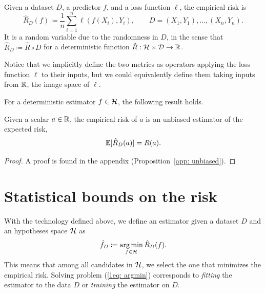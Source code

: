 \documentclass[reqno]{amsart}
\begin{document}
\begin{definition}
Given a dataset $D$, a predictor $f$, and a loss function $\ell$, the empirical risk is
    \begin{equation}
        \hat R_D(f) \coloneq \frac{1}{n}\sum_{i=1}^n \ell(f(X_i),Y_i), \qquad D = (X_1,Y_1),\ldots,(X_n,Y_n).
    \end{equation}
    It is a random variable due to the randomness in $D$, in the sense that $\hat R_D \coloneq \hat R \circ D$ for a deterministic function $\hat R:\mathcal{H} \times \mathcal{D}\to\mathbb{R}$.
\end{definition}

\begin{remark}
    Notice that we implicitly define the two metrics as operators applying the loss function $\ell$ to their inputs, but we could equivalently define them taking inputs from $\mathbb{R}$, the image space of $\ell$. 
\end{remark}
For a deterministic estimator $f\in\mathcal{H}$, the following result holds.

\begin{proposition}\label{1prop: unbiased}
    Given a scalar $a \in \mathbb{R}$, the empirical risk of $a$ is an unbiased estimator of the expected risk,
    \begin{equation}
    \mathbb{E}[\hat R_D(a)] = R(a).
\end{equation}
\begin{proof}
A proof is found in the appendix (Proposition~\ref{app: unbiased}).
\end{proof}
\end{proposition}

\section{Statistical bounds on the risk}\label{sec: bias}

With the technology defined above, we define an estimator given a dataset $D$ and an hypotheses space $\mathcal{H}$ as
\begin{equation}\label{1eq: argmin}
    \hat f_D \coloneq \operatorname*{arg\,min}_{f\in\mathcal{H}} \hat R_D(f).
\end{equation}
This means that among all candidates in $\mathcal{H}$, we select the one that minimizes the empirical risk. Solving problem (\ref{1eq: argmin}) corresponds to {\it\/fitting} the estimator to the data $D$ or {\it\/training} the estimator on $D$. 
\end{document}
